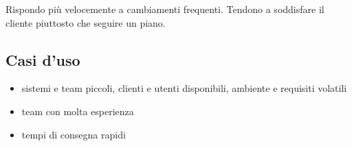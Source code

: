 Rispondo più velocemente a cambiamenti frequenti. Tendono a soddisfare il cliente piuttosto che seguire un piano.

\subsection{Casi d'uso}
\begin{itemize}
    \item sistemi e team piccoli, clienti e utenti disponibili, ambiente e requisiti volatili
    \item team con molta esperienza
    \item tempi di consegna rapidi
\end{itemize}